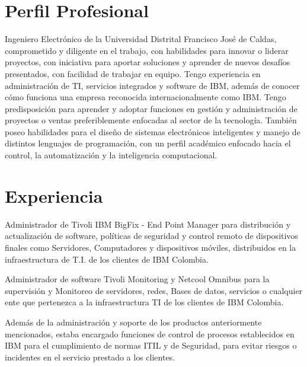 \documentclass[]{deedy-resume-openfont}
\begin{document}
\section{Perfil Profesional}
Ingeniero Electrónico de la Universidad Distrital  Francisco José de Caldas, comprometido y diligente en el trabajo, con habilidades para innovar o liderar proyectos,  con iniciativa para aportar soluciones  y aprender de nuevos desafíos presentados, con facilidad de trabajar en equipo. Tengo  experiencia en administración de TI, servicios integrados y software de IBM,  además de conocer cómo funciona una empresa reconocida internacionalmente como IBM.  Tengo predisposición para aprender y adoptar funciones en gestión y administración de proyectos o ventas preferiblemente enfocadas al sector de la tecnología. También  poseo habilidades para el diseño de sistemas electrónicos  inteligentes  y manejo de distintos lenguajes de programación, con un perfil académico enfocado hacia el control, la automatización y la inteligencia computacional.  

\sectionsep


\section{Experiencia}

\vspace{\topsep} %
\begin{tightemize}
\item Administrador de  Tivoli IBM BigFix - End Point Manager para distribución y actualización de software, políticas de seguridad y control remoto de dispositivos finales como Servidores, Computadores y dispositivos móviles, distribuidos en la infraestructura de T.I. de los clientes de IBM Colombia. 

\item Administrador de software Tivoli Monitoring y Netcool Omnibus  para la supervisión y Monitoreo de servidores, redes, Bases de datos, servicios o cualquier ente que pertenezca a la infraestructura TI de  los clientes de IBM Colombia.

\item Además de la administración y soporte de los productos anteriormente mencionados, estaba encargado funciones de control de procesos establecidos en IBM para el cumplimiento de normas ITIL y de Seguridad, para evitar riesgos o incidentes en el servicio prestado a los clientes. 
\end{tightemize}
\sectionsep
\end{document}
